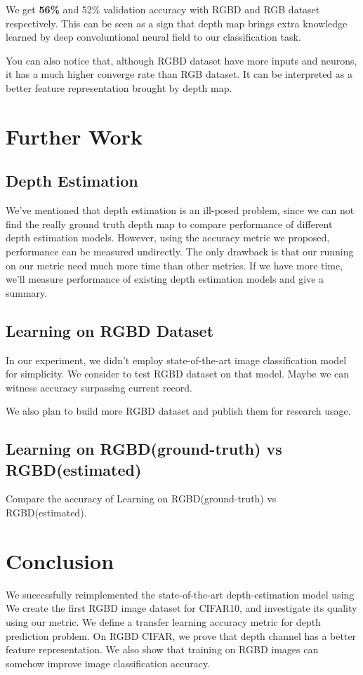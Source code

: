 \documentclass[10pt,twocolumn,letterpaper]{article}
\begin{document}
We get {\bf56\%} and 52\% validation accuracy with RGBD and RGB dataset respectively.
This can be seen as a sign that depth map brings extra knowledge
 learned by deep convoluntional neural field to our classification task.

You can also notice that, although RGBD dataset have more inputs and neurons,
  it has a much higher converge rate than RGB dataset. 
 It can be interpreted as a better feature representation brought by depth map.



\section{Further Work}
\subsection{Depth Estimation}
We\rq{}ve mentioned that depth estimation is an ill-posed problem, 
since we can not find the really ground truth depth map to compare performance of 
different depth estimation models.
However, using the accuracy metric we proposed, performance can be measured 
undirectly.
The only drawback is that our running on our metric need much more time than other metrics.
If we have more time, we\rq{}ll measure performance of existing depth estimation models
 and give a summary.
 
 
\subsection{Learning on RGBD Dataset}
In our experiment, we didn\rq{}t 
employ state-of-the-art image classification model\cite{he2015deep} for simplicity.
We consider to test RGBD dataset on that model. 
Maybe we can witness accuracy surpassing current record.

We also plan to build more RGBD dataset and publish them for research usage.

\subsection{Learning on RGBD(ground-truth) vs RGBD(estimated)}
Compare the accuracy of Learning on RGBD(ground-truth) vs RGBD(estimated).

\section{Conclusion}
We successfully reimplemented the state-of-the-art depth-estimation model using
We create the first RGBD image dataset for CIFAR10, and investigate its quality 
using our metric.
We define a transfer learning accuracy metric for depth prediction problem.
On RGBD CIFAR, we prove that depth channel has a better feature representation.
We also show that training on RGBD images can somehow improve image 
classification accuracy.
\end{document}
